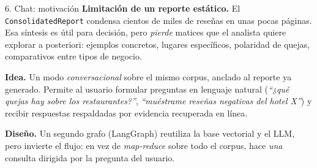 \documentclass[10pt,aspectratio=169]{beamer}
\begin{document}
\begin{frame}{6. Chat: motivación}
	\textbf{Limitación de un reporte estático.} El \texttt{ConsolidatedReport}
	condensa cientos de miles de reseñas en unas pocas páginas. Esa síntesis
	es útil para decisión, pero \emph{pierde} matices que el analista quiere
	explorar a posteriori: ejemplos concretos, lugares específicos, polaridad
	de quejas, comparativos entre tipos de negocio.

	\medskip
	\textbf{Idea.} Un modo \emph{conversacional} sobre el mismo corpus,
	anclado al reporte ya generado. Permite al usuario formular preguntas en
	lenguaje natural (\emph{``¿qué quejas hay sobre los restaurantes?''},
	\emph{``muéstrame reseñas negativas del hotel X''}) y recibir respuestas
	respaldadas por evidencia recuperada en línea.

	\medskip
	\textbf{Diseño.} Un segundo grafo (LangGraph) reutiliza la base vectorial
	y el LLM, pero invierte el flujo: en vez de \emph{map-reduce} sobre todo
	el corpus, hace \emph{una} consulta dirigida por la pregunta del usuario.
\end{frame}
\end{document}
